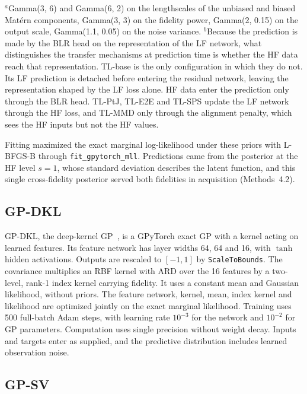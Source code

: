 \begin{table}[p]
{\begin{tabular}
\bottomrule
\end{tabular}}
\par\smallskip
{\fontsize{6.6bp}{7.4bp}\selectfont $^{a}$Gamma(3, 6) and Gamma(6, 2) on the lengthscales of the unbiased and biased Mat\'{e}rn components, Gamma(3, 3) on the fidelity power, Gamma(2, 0.15) on the output scale, Gamma(1.1, 0.05) on the noise variance. $^{b}$Because the prediction is made by the BLR head on the representation of the LF network, what distinguishes the transfer mechanisms at prediction time is whether the HF data reach that representation. TL-base is the only configuration in which they do not. Its LF prediction is detached before entering the residual network, leaving the representation shaped by the LF loss alone. HF data enter the prediction only through the BLR head. TL-PtJ, TL-E2E and TL-SPS update the LF network through the HF loss, and TL-MMD only through the alignment penalty, which sees the HF inputs but not the HF values.}
\end{table}

Fitting maximized the exact marginal log-likelihood under these priors with L-BFGS-B through \texttt{fit\_gpytorch\_mll}. Predictions came from the posterior at the HF level $s=1$, whose standard deviation describes the latent function, and this single cross-fidelity posterior served both fidelities in acquisition (Methods~4.2).

\subsection{GP-DKL}

GP-DKL, the deep-kernel GP~\citep{wilson2016deep}, is a GPyTorch exact GP with a kernel acting on learned features. Its feature network has layer widths 64, 64 and 16, with $\tanh$ hidden activations. Outputs are rescaled to $[-1, 1]$ by \texttt{ScaleToBounds}. The covariance multiplies an RBF kernel with ARD over the 16 features by a two-level, rank-1 index kernel carrying fidelity. It uses a constant mean and Gaussian likelihood, without priors. The feature network, kernel, mean, index kernel and likelihood are optimized jointly on the exact marginal likelihood. Training uses 500 full-batch Adam steps, with learning rate $10^{-3}$ for the network and $10^{-2}$ for GP parameters. Computation uses single precision without weight decay. Inputs and targets enter as supplied, and the predictive distribution includes learned observation noise.

\subsection{GP-SV}

